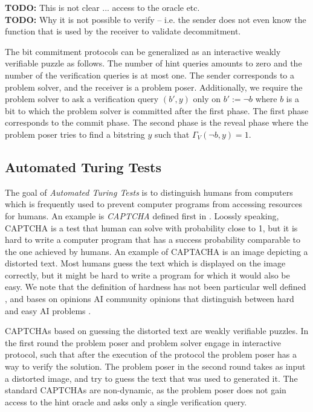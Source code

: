 \begin{todo}
  \textbf{TODO:} This is not clear ... access to the oracle etc.\\
  \textbf{TODO:} Why it is not possible to verify -- i.e. the sender does not even
  know the function that is used by the receiver to validate decommitment.
\end{todo}

The bit commitment protocols can be generalized as an interactive weakly verifiable puzzle as follows.
The number of hint queries amounts to zero and the number of the verification queries is at most one.
The sender corresponds to a problem solver, and the receiver is a problem poser.
Additionally, we require the problem solver to ask a verification query $(b',y)$ only on $b' := \lnot b$ where $b$
is a bit to which the problem solver is committed after the first phase.
The first phase corresponds to the commit phase.
The second phase is the reveal phase where the problem poser tries to find a bitstring $y$ such that $\Gamma_V(\lnot b, y) = 1$.

\subsection{Automated Turing Tests}
The goal of \textit{Automated Turing Tests} is to distinguish humans from computers which
is frequently used to prevent computer programs from accessing resources for humans.
An example is \textit{CAPTCHA} defined first in \cite{von2003captcha}.
Loossly speaking, CAPTCHA is a test that human can solve with probability close to 1, but it is hard to write a computer program
that has a success probability comparable to the one achieved by humans.
An example of CAPTACHA is an image depicting a distorted text. Most humans guess the text which is displayed on the image correctly, but it might be hard to write
a program for which it would also be easy. We note that the definition of hardness has not been particular well defined ,
and bases on opinions AI community opinions that distinguish between hard and easy AI problems \cite{von2003captcha}.

CAPTCHAs based on guessing the distorted text are weakly verifiable puzzles.
In the first round the problem poser and problem solver engage in interactive protocol, such that
after the execution of the protocol the problem poser has a way to verify the solution.
The problem poser in the second round takes as input a distorted image, and try to guess the text that was used to generated it.
The standard CAPTCHAs are non-dynamic, as the problem poser does not gain access to the hint oracle and
asks only a single verification query.

